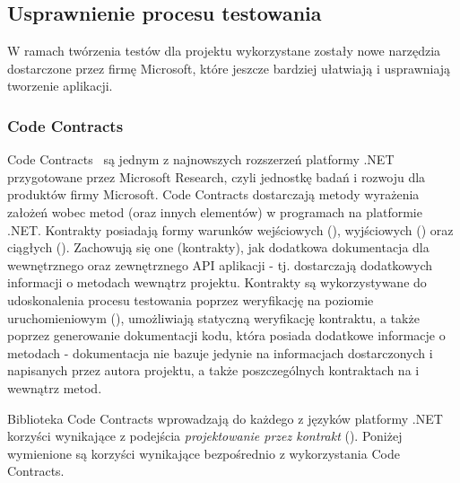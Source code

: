 \subsection{Usprawnienie procesu testowania}
W ramach twórzenia testów dla projektu wykorzystane zostały nowe narzędzia dostarczone przez firmę Microsoft, które jeszcze bardziej ułatwiają i usprawniają tworzenie aplikacji.

\subsubsection{Code Contracts}
Code Contracts~\cite{ms:codecontracts} są jednym z najnowszych rozszerzeń platformy .NET przygotowane przez Microsoft Research, czyli jednostkę badań i rozwoju dla produktów firmy Microsoft. Code Contracts dostarczają metody wyrażenia założeń wobec metod (oraz innych elementów) w programach na platformie .NET. Kontrakty posiadają formy warunków wejściowych (), wyjściowych () oraz ciągłych (). Zachowują się one (kontrakty), jak dodatkowa dokumentacja dla wewnętrznego oraz zewnętrznego API aplikacji - tj. dostarczają dodatkowych informacji o metodach wewnątrz projektu. Kontrakty są wykorzystywane do udoskonalenia procesu testowania poprzez weryfikację na poziomie uruchomieniowym (), umożliwiają statyczną weryfikację kontraktu, a także poprzez generowanie dokumentacji kodu, która posiada dodatkowe informacje o metodach - dokumentacja nie bazuje jedynie na informacjach dostarczonych i napisanych przez autora projektu, a także poszczególnych kontraktach na i wewnątrz metod.

Biblioteka Code Contracts wprowadzają do każdego z języków platformy .NET korzyści wynikające z podejścia \emph{projektowanie przez kontrakt} (). Poniżej wymienione są korzyści wynikające bezpośrednio z wykorzystania Code Contracts.

